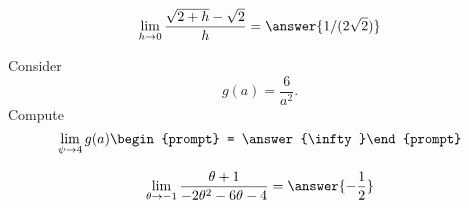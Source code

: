 \documentclass[handout]{ximera}
\begin{document}
\begin{exercise}
	\[\lim_{h \to 0} \frac{\sqrt{2+h} - \sqrt{2}}{h} = \answer{1/(2\sqrt{2})}\]
    
\end{exercise}

\begin{exercise}
Consider 
\[
g(a) = \frac{6}{a^2}.
\]
Compute
\[ \displaystyle\lim_{\psi\to 4 } g(a) \begin{prompt} = \answer{\infty}\end{prompt} \]

\end{exercise}

\begin{exercise}
\[
\lim_{\theta\to -1 } \frac{\theta +1}{-2 \theta ^2-6 \theta -4} = \answer{-\frac{1}{2}}
\]
\end{exercise}
\end{document}
